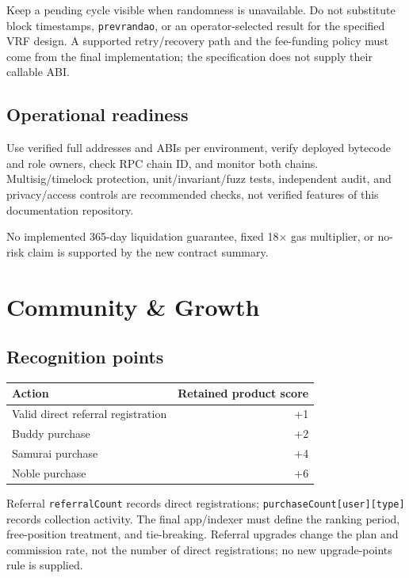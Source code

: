 \documentclass[
  10pt,
  letterpaper,
]{article}
\begin{document}
Keep a pending cycle visible when randomness is unavailable. Do not
substitute block timestamps, \texttt{prevrandao}, or an
operator-selected result for the specified VRF design. A supported
retry/recovery path and the fee-funding policy must come from the final
implementation; the specification does not supply their callable ABI.

\subsection{Operational readiness}\label{operational-readiness}

Use verified full addresses and ABIs per environment, verify deployed
bytecode and role owners, check RPC chain ID, and monitor both chains.
Multisig/timelock protection, unit/invariant/fuzz tests, independent
audit, and privacy/access controls are recommended checks, not verified
features of this documentation repository.

No implemented 365-day liquidation guarantee, fixed 18× gas multiplier,
or no-risk claim is supported by the new contract summary.

\section{Community \& Growth}\label{community-growth}

\subsection{Recognition points}\label{recognition-points}

\begin{longtable}[]{@{}lr@{}}
\toprule\noalign{}
Action & Retained product score \\
\midrule\noalign{}
\endhead
\bottomrule\noalign{}
\endlastfoot
Valid direct referral registration & +1 \\
Buddy purchase & +2 \\
Samurai purchase & +4 \\
Noble purchase & +6 \\
\end{longtable}

Referral \texttt{referralCount} records direct registrations;
\texttt{purchaseCount{[}user{]}{[}type{]}} records collection activity.
The final app/indexer must define the ranking period, free-position
treatment, and tie-breaking. Referral upgrades change the plan and
commission rate, not the number of direct registrations; no new
upgrade-points rule is supplied.
\end{document}
